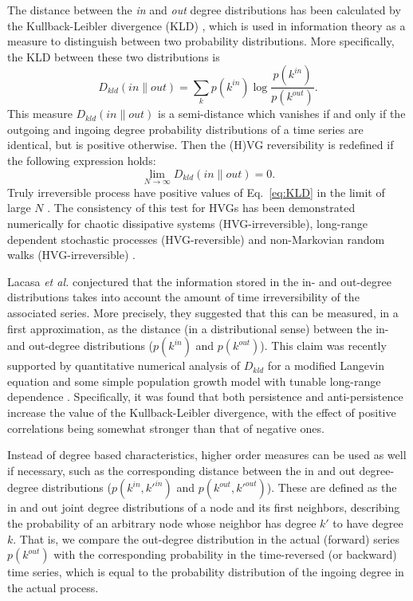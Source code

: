 		The distance between the \textit{in} and \textit{out} degree distributions has been calculated by the Kullback-Leibler divergence (KLD) \cite{Lacasa2012,Lacasa2015}, which is used in information theory as a measure to distinguish between two probability distributions. More specifically, the KLD between these two distributions is
\begin{equation}\label{eq:KLD}
D_{k l d}(in \| out) = \sum_{k} p(k^{in}) \log \frac{p(k^{in})}{p(k^{out})}. 
\end{equation}
This measure $D_{k l d}(in\|out)$ is a semi-distance which vanishes if and only if the outgoing and ingoing degree probability distributions of a time series are identical, but is positive otherwise. Then the (H)VG reversibility is redefined if the following expression holds:
\begin{equation}
\lim_{N \to \infty} {D_{k l d}(in\|out)} = 0. 
\end{equation}		
Truly irreversible process have positive values of Eq.~\eqref{eq:KLD} in the limit of large $N$ \cite{Lacasa2012}. The consistency of this test for HVGs has been demonstrated numerically for chaotic dissipative systems (HVG-irreversible), long-range dependent stochastic processes (HVG-reversible) \cite{Lacasa2012} and non-Markovian random walks (HVG-irreversible) \cite{Lacasa2015}.

		Lacasa \textit{et al.}\cite{Lacasa2012, Lacasa2015} conjectured that the information stored in the in- and out-degree distributions takes into account the amount of time irreversibility of the associated series. More precisely, they suggested that this can be measured, in a first approximation, as the distance (in a distributional sense) between the in- and out-degree distributions ($p(k^{in})$ and $p(k^{out})$). This claim was recently supported by quantitative numerical analysis of $D_{k l d}$ for a modified Langevin equation and some simple population growth model with tunable long-range dependence \cite{Telesca2018c}. Specifically, it was found that both persistence and anti-persistence increase the value of the Kullback-Leibler divergence, with the effect of positive correlations being somewhat stronger than that of negative ones.
        
        Instead of degree based characteristics, higher order measures can be used as well if necessary, such as the corresponding distance between the in and out degree-degree distributions ($p(k^{in}, k'^{in})$ and $p(k^{out}, k'^{out})$). These are defined as the in and out joint degree distributions of a node and its first neighbors, describing the probability of an arbitrary node whose neighbor has degree $k'$ to have degree $k$. That is, we compare the out-degree distribution in the actual (forward) series $p(k^{out})$ with the corresponding probability in the time-reversed (or backward) time series, which is equal to the probability distribution of the ingoing degree in the actual process. 
		
